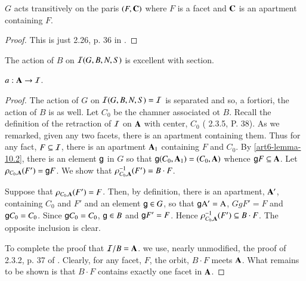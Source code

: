 \begin{lem}\label{art6-lemma-10.2}
$G$ acts transitively on the paris $(F, \mathbf{C})$ where $F$ is a facet and $\mathbf{C}$ is an apartment containing $F$. 
\end{lem}

\begin{proof}
This is just 2.26, p. 36 in \cite{art6-keyBT I}.
\end{proof}

\begin{prop}\label{art6-proposition-10.3}
The action of $B$ on $\mathcal{I}(G, B, N, S)$ is excellent with section.

$a: \mathbf{A} \rightarrow \mathcal{I}$.
\end{prop}

\begin{proof}
The action of $G$ on $\mathcal{I}(G, B, N, S)= \mathcal{I}$ is separated and so, a fortiori, the action of $B$ is as well. Let $C_{0}$ be the chamner associated ot $B$. Recall the definition of the retraction of $\mathcal{I}$ on $\mathbf{A}$ with center, $C_{0}$ (\cite{art6-keyBT I} 2.3.5, P. 38). As we remarked, given any two facets, there is an apartment containing them. Thus for any fact, $F\subseteq \mathcal{I}$, there is an apartment $\mathbf{A}_{1}$ containing $F$ and $C_{0}$. By \ref{art6-lemma-10.2}, there is an element $\mathsf{g}$ in $G$ so that $\mathsf{g}(C_{0}, \mathbf{A}_{1}) = (C_{0}, \mathbf{A})$ whence $\mathsf{g} F\subseteq \mathbf{A}$.
Let $\rho_{C_{0},\mathbf{A}}(F') =\mathsf{g} F$. We show that $\rho_{C_{0},\mathbf{A}}^{-1}(F') =B \cdot F$.

Suppose that $\rho_{C_{0},\mathbf{A}}(F') = F$. Then, by definition, there is an apartment, $\mathbf{A}'$, containing $C_{0}$ and $F'$ and an element $\mathsf{g} \in G$, so that $\mathsf{g}\rm A' = \rm A$, $GgF' = F$ and $\mathsf{g} C_{0} = C_{0}$. Since $\mathsf{g} C_{0} =C_{0}$, $\mathsf{g} \in B$ and $\mathsf{g} F' = F$. Hence $\rho_{C_{0},\mathbf{A}}^{-1}(F') \subseteq B \cdot F$. The opposite inclusion is clear.

To complete the proof that $\mathcal{I}/B = \mathbf{A}$. we use, nearly unmodified, the proof of 2.3.2, p. 37 of \cite{art6-BT I}. Clearly, for any facet, $F$, the orbit, $B \cdot F$ meets $\mathbf{A}$. What remains to be shown is that $B \cdot F$ contains exactly one facet in $\mathbf{A}$.


\end{proof}
